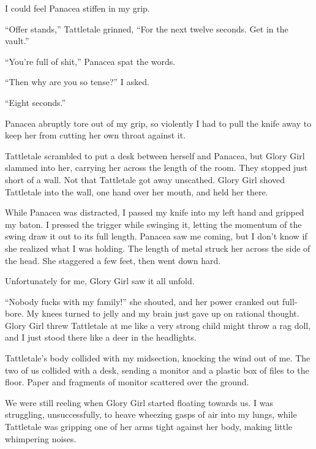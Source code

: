 I could feel Panacea stiffen in my grip.



``Offer stands,'' Tattletale grinned, ``For the next twelve seconds.  Get in the vault.''



``You're full of shit,'' Panacea spat the words.



``Then why are you so tense?'' I asked.



``Eight seconds.''



Panacea abruptly tore out of my grip, so violently I had to pull the knife away to keep her from cutting her own throat against it.



Tattletale scrambled to put a desk between herself and Panacea, but Glory Girl slammed into her, carrying her across the length of the room.  They stopped just short of a wall.  Not that Tattletale got away unscathed.  Glory Girl shoved Tattletale into the wall, one hand over her mouth, and held her there.



While Panacea was distracted, I passed my knife into my left hand and gripped my baton.  I pressed the trigger while swinging it, letting the momentum of the swing draw it out to its full length.  Panacea saw me coming, but I don't know if she realized what I was holding.  The length of metal struck her across the side of the head.  She staggered a few feet, then went down hard.



Unfortunately for me, Glory Girl saw it all unfold.



``Nobody fucks with my family!'' she shouted, and her power cranked out full-bore.  My knees turned to jelly and my brain just gave up on rational thought.  Glory Girl threw Tattletale at me like a very strong child might throw a rag doll, and I just stood there like a deer in the headlights.



Tattletale's body collided with my midsection, knocking the wind out of me.  The two of us collided with a desk, sending a monitor and a plastic box of files to the floor.  Paper and fragments of monitor scattered over the ground.



We were still reeling when Glory Girl started floating towards us.  I was struggling, unsuccessfully, to heave wheezing gasps of air into my lungs, while Tattletale was gripping one of her arms tight against her body, making little whimpering noises.



